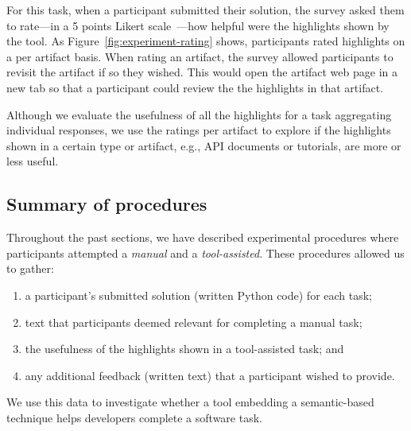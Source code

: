 For this task, when a participant submitted their solution, the survey asked them to 
rate---in a 5 points Likert scale~\cite{likert1932technique}---how helpful were the highlights shown by the tool.
As Figure~\ref{fig:experiment-rating} shows, participants rated highlights on a per artifact basis. When rating an artifact, the survey allowed participants to revisit the artifact if so they wished. This would open the artifact web page in a new tab so that a participant
could review the the highlights in that artifact.

Although we evaluate the usefulness of all the highlights for a task
aggregating individual responses, we use the ratings per artifact to explore if the highlights shown in a certain type or artifact, e.g., API documents or tutorials, are more or less useful.





\subsection{Summary of procedures}


Throughout the past sections, we have described experimental procedures 
where participants attempted a \textit{manual} and a \textit{tool-assisted}.
These procedures allowed us to gather:


\begin{enumerate}
\item a participant's submitted solution (written Python code) for each task;
\item text that participants deemed relevant for completing a manual task;
\item the usefulness of the highlights shown in a tool-assisted task; and
\item any additional feedback (written text) that a participant wished to provide.
\end{enumerate}


We use this data to investigate whether 
a tool embedding a semantic-based technique helps developers complete a software task. 


\clearpage


